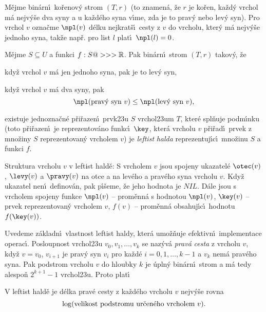 \documentclass[a4paper,12pt]{article}
\begin{document}
\flushpar M\v ejme bin\'arn\'\i\ ko\v renov\'y strom $(T,r)$ (to znamen\'a, \v ze $
r$ je ko\v ren, 
ka\v zd\'y vrchol m\'a nejv\'y\v se dva syny a u ka\v zd\'eho syna 
v\'\i me, zda je to prav\'y nebo lev\'y syn). Pro vrchol $v$ 
ozna\v cme $\npl(v)$ d\'elku nejkrat\v s\'\i\ cesty z $v$ do vrcholu, kter\'y m\'a 
nejv\'y\v se jednoho syna, tak\v ze nap\v r. pro list $l$ plat\'\i\ $\npl
(l)=0$. 
\medskip

\flushpar M\v ejme $S\subseteq U$ a funkci $f:S@>>>\Bbb R$. Pak bin\'arn\'\i\ strom 
$(T,r)$ takov\'y, \v ze
\roster
\item
kdy\v z vrchol $v$ m\'a jen jednoho syna, pak je to lev\'y syn,
\item
kdy\v z vrchol $v$ m\'a dva syny, pak 
$$\npl(\text{\rm prav\'y syn }v)\le\npl(\text{\rm lev\'y syn }v),$$
\item
existuje jednozna\v cn\'e p\v ri\v razen\'\i\ prvk\accent23u $S$  
vrchol\accent23um $T$, kter\'e spl\v nuje podm\'\i nku  
(toto p\v ri\v razen\'\i\ 
je reprezentov\'ano funkc\'\i\ $\key$, kter\'a vrcholu $v$ p\v ri\v rad\'\i\ prvek 
z mno\v zi\-ny $S$ reprezentovan\'y vrcholem $v$)
\endroster
je \emph{leftist} \emph{halda} 
reprezentuj\'\i c\'\i\ mno\v zinu $S$ a funkci $f$. 
\medskip

\flushpar Struktura vrcholu $v$ v leftist hald\v e:\newline 
S vrcholem $v$ jsou 
spojeny ukazatel\'e $\otec(v)$, $\levy(v)$ a $\pravy(v)$ na otce a 
na lev\'eho a prav\'eho syna vrcholu $v$.  
Kdy\v z ukazatel nen\'\i\ definov\'an, pak p\'\i\v seme, \v ze jeho hodnota je 
$NIL$.  D\'ale jsou s vrcholem spojeny funkce\newline 
$\npl(v)$ -- prom\v enn\'a s hodnotou $\npl(v)$,\newline 
$\key(v)$ -- prvek reprezentovan\'y vrcholem $v$,\newline 
$f(v)$ -- prom\v enn\'a obsahuj\'\i c\'\i\ hodnotu $f(\key(v))$.
\medskip

\flushpar Uvedeme z\'akladn\'\i\ vlastnost leftist haldy, kter\'a 
umo\v z\v nuje efektivn\'\i\ implementace operac\'\i . 
Posloupnost vrchol\accent23u $v_0,v_1,\dots,v_k$ se naz\'yv\'a 
\emph{prav\'a} \emph{cesta} z vrcholu $v$, kdy\v z $v=v_0$, $v_{i
+1}$ 
je prav\'y syn $v_i$ pro ka\v zd\'e $i=0,1,\dots,k-1$ a $v_k$ nem\'a 
prav\'eho syna. Pak podstrom vrcholu $v$ do hloubky $k$ je 
\'upln\'y bin\'arn\'\i\ strom a m\'a tedy  
alespo\v n $2^{k+1}-1$ vrchol\accent23u. Proto plat\'\i\ 

V leftist hald\v e je 
d\'elka prav\'e cesty z ka\v zd\'eho vrcholu $v$ nejv\'y\v se rovna 
$$\log(\text{\rm velikost podstromu ur\v cen\'eho vrcholem }v).$$
\endproclaim
\bigskip
\end{document}
